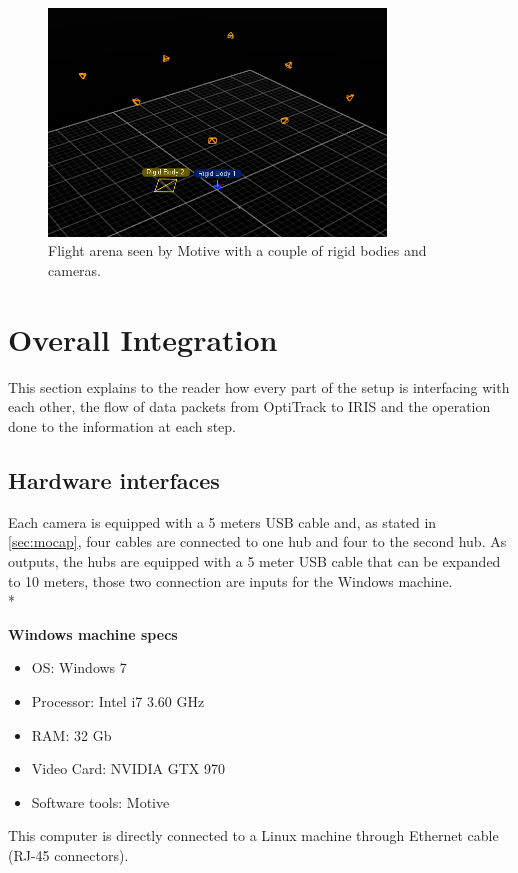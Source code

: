 \begin{figure}[h]
	\centering
	\includegraphics[width=0.8\textwidth]{motiv_panorama.PNG}
	\caption[Flight arena from motive]{Flight arena seen by Motive with a couple of rigid bodies and cameras.}
	\label{figure:arenamotive}
\end{figure}



\section{Overall Integration}
\label{sec:integration}

This section explains to the reader how every part of the setup is interfacing with each other, the flow of data packets from OptiTrack to IRIS and the operation done to the information at each step.

\subsection{Hardware interfaces}

Each camera is equipped with a 5 meters USB cable and, as stated in \ref{sec:mocap}, four cables are connected to one hub and four to the second hub. As outputs, the hubs are equipped with a 5 meter USB cable that can be expanded to 10 meters, those two connection are inputs for the Windows machine. \\*

\noindent
\textbf{Windows machine specs} 
\begin{itemize}

\item OS: Windows 7 
\item Processor: Intel i7 3.60 GHz
\item RAM: 32 Gb
\item Video Card: NVIDIA GTX 970
\item Software tools: Motive

\end{itemize}
This computer is directly connected to a Linux machine through Ethernet cable (RJ-45 connectors). \\

